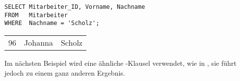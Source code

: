           \begin{lstlisting}[language=oracle_sql,caption={Ein einfacher Zeichenkettenvergleich},label=sql02_06]
SELECT Mitarbeiter_ID, Vorname, Nachname
FROM   Mitarbeiter
WHERE  Nachname = 'Scholz';
          \end{lstlisting}
          \begin{center}
            \begin{small}
              \tablehead{}
              \tabletail{
              }
              \begin{msoraclesql}
                \begin{supertabular}{rll}
                  96 & Johanna & Scholz \\
                \end{supertabular}
              \end{msoraclesql}
            \end{small}
          \end{center}
          Im nächsten Beispiel wird eine ähnliche -Klausel verwendet, wie in , sie führt jedoch zu einem ganz anderen Ergebnis.


